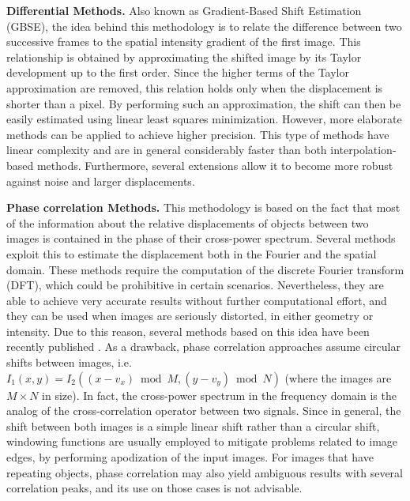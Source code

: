 {\bf Differential Methods.} Also known as Gradient-Based Shift Estimation (GBSE), the idea behind this methodology is to relate the difference between two successive frames to the spatial intensity gradient of the first image. This relationship is obtained by approximating the shifted image by its Taylor development up to the first order. Since the higher terms of the Taylor approximation are removed, this relation holds only when the displacement is shorter than a pixel. By performing such an approximation, the shift can then be easily estimated using linear least squares minimization. However, more elaborate methods can be applied to achieve higher precision.
This type of methods have linear complexity and are in general considerably faster than both interpolation-based methods. Furthermore, several extensions allow it to become more robust against noise and larger displacements.

{\bf Phase correlation Methods.} This methodology is based on the fact that most of the information about the relative displacements of objects between two images is contained in the phase of their cross-power spectrum. Several methods exploit this to estimate the displacement both in the Fourier and the spatial domain. These methods require  the computation of the discrete Fourier transform (DFT), which could be prohibitive in certain scenarios. Nevertheless, they are able to achieve very accurate results without further computational effort, and they can be used when images are seriously distorted, in either geometry or intensity. Due to this reason, several methods based on this idea have been recently published \cite{Reddy1996, Stone_2001, Foroosh2002, Takita2003, Guizar-Sicairos08, Argyriou2004, Argyriou2006, Tzimiropoulos2011, Tzimiropoulos2016, Ren_2014, Ren_2010}. As a drawback, phase correlation approaches assume circular shifts between images, i.e. $I_1(x,y) = I_2((x - v_x) \bmod M, (y - v_y) \bmod N)$ (where the images are $M \times N$ in size). In fact, the cross-power spectrum in the frequency domain is the analog of the cross-correlation operator between two signals.
Since in general, the shift between both images is a simple linear shift rather than a circular shift, windowing functions are usually employed to mitigate problems related to image edges, by performing apodization of the input images. For images that have repeating objects, phase correlation may also yield ambiguous results with several correlation peaks, and its use on those cases is not advisable. 

